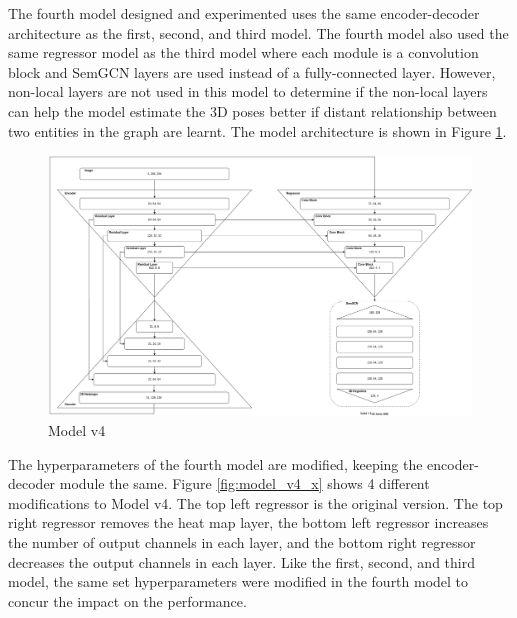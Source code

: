 \newpage

\noindent
The fourth model designed and experimented uses the same encoder-decoder architecture as the first, second, and third model. The fourth model also used the same regressor model as the third model where each module is a convolution block and SemGCN layers are used instead of a fully-connected layer. However, non-local layers are not used in this model to determine if the non-local layers can help the model estimate the 3D poses better if distant relationship between two entities in the graph are learnt. The model architecture is shown in Figure \ref{fig:model_v4}.

\begin{figure}[ht]
	\begin{center}
		\includegraphics[width=450px]{assets/Model_v4.jpg}
		\caption{Model v4}
		\label{fig:model_v4}
	\end{center}
\end{figure}

\newpage

\noindent
The hyperparameters of the fourth model are modified, keeping the encoder-decoder module the same. Figure \ref{fig:model_v4_x} shows 4 different modifications to Model v4. The top left regressor is the original version. The top right regressor removes the heat map layer, the bottom left regressor increases the number of output channels in each layer, and the bottom right regressor decreases the output channels in each layer. Like the first, second, and third model, the same set hyperparameters were modified in the fourth model to concur the impact on the performance.


